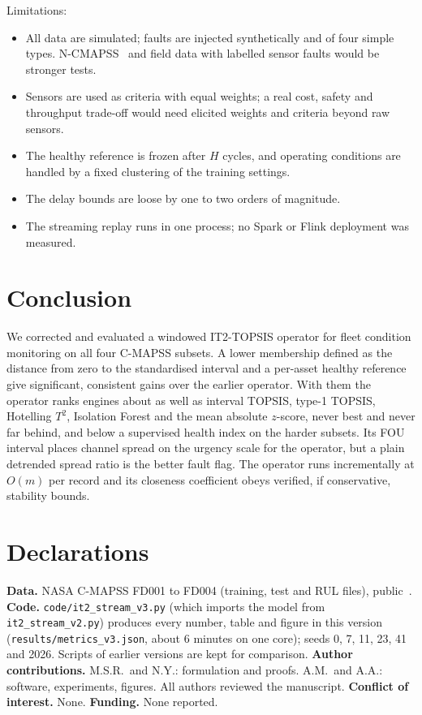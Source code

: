 \documentclass[journal,10pt,twocolumn]{IEEEtran}
\begin{document}
Limitations:
\begin{itemize}
\item All data are simulated; faults are injected synthetically and of four simple types. N-CMAPSS~\cite{arias2021} and field data with labelled sensor faults would be stronger tests.
\item Sensors are used as criteria with equal weights; a real cost, safety and throughput trade-off would need elicited weights and criteria beyond raw sensors.
\item The healthy reference is frozen after $H$ cycles, and operating conditions are handled by a fixed clustering of the training settings.
\item The delay bounds are loose by one to two orders of magnitude.
\item The streaming replay runs in one process; no Spark or Flink deployment was measured.
\end{itemize}

\section{Conclusion}
We corrected and evaluated a windowed IT2-TOPSIS operator for fleet condition monitoring on all four C-MAPSS subsets. A lower membership defined as the distance from zero to the standardised interval and a per-asset healthy reference give significant, consistent gains over the earlier operator. With them the operator ranks engines about as well as interval TOPSIS, type-1 TOPSIS, Hotelling $T^2$, Isolation Forest and the mean absolute $z$-score, never best and never far behind, and below a supervised health index on the harder subsets. Its FOU interval places channel spread on the urgency scale for the operator, but a plain detrended spread ratio is the better fault flag. The operator runs incrementally at $O(m)$ per record and its closeness coefficient obeys verified, if conservative, stability bounds.

\section*{Declarations}
\textbf{Data.} NASA C-MAPSS FD001 to FD004 (training, test and RUL files), public~\cite{saxena2008}. \textbf{Code.} \texttt{code/it2\_stream\_v3.py} (which imports the model from \texttt{it2\_stream\_v2.py}) produces every number, table and figure in this version (\texttt{results/metrics\_v3.json}, about 6 minutes on one core); seeds 0, 7, 11, 23, 41 and 2026. Scripts of earlier versions are kept for comparison. \textbf{Author contributions.} M.S.R.\ and N.Y.: formulation and proofs. A.M.\ and A.A.: software, experiments, figures. All authors reviewed the manuscript. \textbf{Conflict of interest.} None. \textbf{Funding.} None reported.
\end{document}
